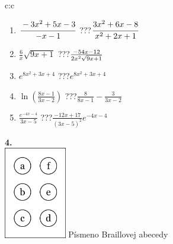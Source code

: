 \documentclass[10pt]{report}
\begin{document}
\begin{tabular}{c:c}
\begin{minipage}[c][104.5mm][t]{0.5\linewidth}
\begin{center}
\begin{minipage}{0.79\linewidth}
\begin{center}
\begin{varwidth}{\linewidth}
\begin{enumerate}
\item $\cfrac{-3x^2+5x-3}{-x-1}$\quad \dotfill\; ???\;\dotfill \quad $\cfrac{3x^2+6x-8}{x^2+2x+1}$
\item $\frac{6}{x}\sqrt{9x+1}$\quad \dotfill\; ???\;\dotfill \quad $\frac{-54x-12}{2x^2 \sqrt{\smash[b]{9x+1}}}$
\item $e^{8x^2+3x+4}$\quad \dotfill\; ???\;\dotfill \quad $e^{8x^2+3x+4}$
\item $\ln{\left(\frac{8x-1}{3x-2}\right)}$\quad \dotfill\; ???\;\dotfill \quad $\frac{8}{8x-1}-\frac{3}{3x-2}$
\item $\frac{e^{-4x-4}}{3x-5}$\quad \dotfill\; ???\;\dotfill \quad $\frac{-12x+17}{(3x-5)^2}e^{-4x-4}$
\end{enumerate}
\end{varwidth}
\end{center}
\end{minipage}
\begin{minipage}{0.20\linewidth}
\begin{center}
{\Huge\bfseries 4.} \\[2mm]
\includegraphics[height=40mm]{../images/braille.png}
{\small Písmeno Braillovej abecedy}
\end{center}
\end{minipage}
\end{center}
\end{minipage}
%
\end{tabular}
\newpage
\thispagestyle{empty}
\end{document}
